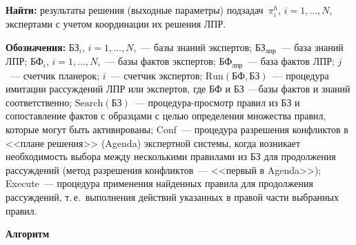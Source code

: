 \begin{multicols}{2}
\smallskip
  
\noindent
  \textbf{Найти:} результаты решения (выходные пара\-мет\-ры) 
подзадач~$\pi_i^h$, $i=1, \ldots ,N$, экспертами с учетом координации их 
решения ЛПР.

\smallskip
  
\noindent  
\textbf{Обозначения:} БЗ$_i$, $i = 1, \ldots , N$,~--- базы знаний экспертов; 
БЗ$_{\mathrm{лпр}}$~--- база знаний ЛПР; БФ$_i$, $i = 1, \ldots , N$,~--- базы 
фактов экспертов; БФ$_{\mathrm{лпр}}$~--- база фактов ЛПР;  $j$~--- счетчик 
планерок; $i$~--- счетчик экспертов; $\mathrm{Run}(\mathrm{БФ,БЗ})$~--- процедура имитации\linebreak 
рассуждений ЛПР или экспертов, где БФ и БЗ~---\linebreak базы фактов и знаний 
соответственно; $\mathrm{Search}(\mathrm{БЗ})$~--- про\-це\-ду\-ра-про\-смотр правил из БЗ и 
сопоставление фактов с образцами с целью определения множества правил, 
которые могут быть активированы; Conf~--- процедура разрешения 
конфликтов в <<плане решения>> (Agenda) экспертной системы, когда 
возникает необходимость выбора между несколькими правилами из БЗ для 
продолжения рассуждений (метод разрешения конфликтов~--- <<первый в 
Agenda>>); Execute~--- процедура применения найден\-ных правила для 
продолжения рассуждений, т.\,е.\ выполнения действий указанных в правой 
части выбранных правил.

\smallskip
  
\noindent
  \textbf{Алгоритм}
  

\end{multicols}
